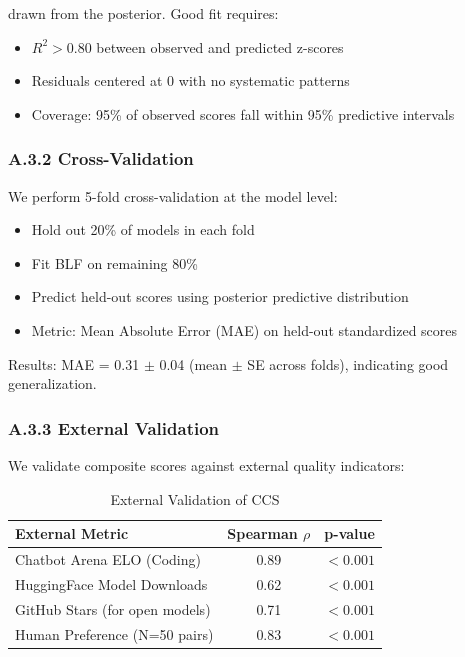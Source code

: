 drawn from the posterior. Good fit requires:
\begin{itemize}
    \item $R^2 > 0.80$ between observed and predicted z-scores
    \item Residuals centered at 0 with no systematic patterns
    \item Coverage: 95\% of observed scores fall within 95\% predictive intervals
\end{itemize}

\subsubsection*{A.3.2 Cross-Validation}

We perform 5-fold cross-validation at the model level:
\begin{itemize}
    \item Hold out 20\% of models in each fold
    \item Fit BLF on remaining 80\%
    \item Predict held-out scores using posterior predictive distribution
    \item Metric: Mean Absolute Error (MAE) on held-out standardized scores
\end{itemize}

Results: MAE = 0.31 $\pm$ 0.04 (mean $\pm$ SE across folds), indicating good generalization.

\subsubsection*{A.3.3 External Validation}

We validate composite scores against external quality indicators:

\begin{table}[h]
\centering
\caption{External Validation of CCS}
\begin{tabular}{lcc}
\toprule
\textbf{External Metric} & \textbf{Spearman $\rho$} & \textbf{p-value} \\
\midrule
Chatbot Arena ELO (Coding) & 0.89 & $< 0.001$ \\
HuggingFace Model Downloads & 0.62 & $< 0.001$ \\
GitHub Stars (for open models) & 0.71 & $< 0.001$ \\
Human Preference (N=50 pairs) & 0.83 & $< 0.001$ \\
\bottomrule
\end{tabular}
\end{table}

